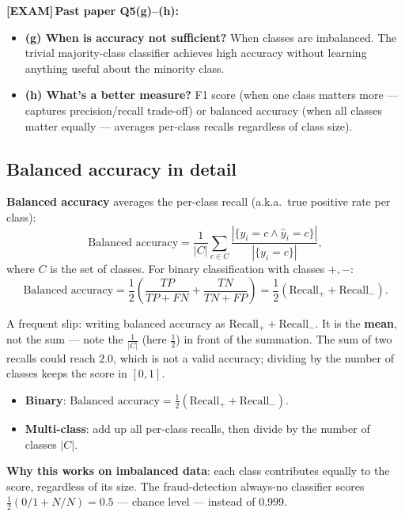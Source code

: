\documentclass[11pt, a4paper]{article}
\newcommand{\examflag}{\textcolor{tipBd}{\textbf{[EXAM]}}\,}
\begin{document}
\examflag{}\textbf{Past paper Q5(g)--(h):}
\begin{itemize}
  \item \textbf{(g) When is accuracy not sufficient?} When classes are imbalanced. The trivial majority-class classifier achieves high accuracy without learning anything useful about the minority class.
  \item \textbf{(h) What's a better measure?} F1 score (when one class matters more — captures precision/recall trade-off) or balanced accuracy (when all classes matter equally — averages per-class recalls regardless of class size).
\end{itemize}

\subsection{Balanced accuracy in detail}

\begin{defbox}
\textbf{Balanced accuracy} averages the per-class recall (a.k.a.\ true positive rate per class):
\[
\text{Balanced accuracy} = \frac{1}{|C|}\sum_{c \in C}\frac{|\{y_i = c \wedge \hat{y}_i = c\}|}{|\{y_i = c\}|},
\]
where $C$ is the set of classes. For binary classification with classes $+, -$:
\[
\text{Balanced accuracy} = \frac{1}{2}\left(\frac{TP}{TP+FN} + \frac{TN}{TN+FP}\right) = \frac{1}{2}(\text{Recall}_+ + \text{Recall}_-).
\]
\end{defbox}

\begin{pitfallbox}
A frequent slip: writing balanced accuracy as $\text{Recall}_+ + \text{Recall}_-$. It is the \textbf{mean}, not the sum — note the $\tfrac{1}{|C|}$ (here $\tfrac{1}{2}$) in front of the summation. The sum of two recalls could reach $2.0$, which is not a valid accuracy; dividing by the number of classes keeps the score in $[0,1]$.
\begin{itemize}
  \item \textbf{Binary}: $\text{Balanced accuracy} = \tfrac{1}{2}(\text{Recall}_+ + \text{Recall}_-)$.
  \item \textbf{Multi-class}: add up all per-class recalls, then divide by the number of classes $|C|$.
\end{itemize}
\end{pitfallbox}

\textbf{Why this works on imbalanced data}: each class contributes equally to the score, regardless of its size. The fraud-detection always-no classifier scores $\tfrac{1}{2}(0/1 + N/N) = 0.5$ — chance level — instead of 0.999.
\end{document}
